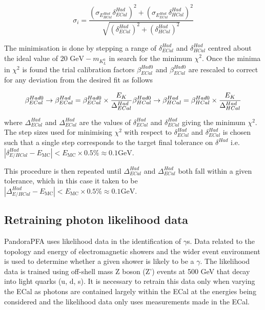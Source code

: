 \begin{equation}
\sigma_{i} = \frac{(\sigma_{E^{Had}_{HCal}}  \delta^{Had}_{ECal})^{2} + (\sigma_{E^{Had}_{ECal}} \delta^{Had}_{HCal})^{2}}{\sqrt{(\delta^{Had}_{ECal})^{2} + (\delta^{Had}_{HCal})^{2}}}
\label{equ:sigmaxicalc}
\end{equation}

The minimisation is done by stepping a range of $\delta^{Had}_{ECal}$ and $\delta^{Had}_{HCal}$ centred about the ideal value of $20 \text { GeV} - m_{K^{0}_{L}}$ in search for the minimum $\chi^{2}$.  Once the minima in $\chi^{2}$ is found the trial calibration factors $\beta^{Had0}_{ECal}$ and $\beta^{Had0}_{ECal}$ are rescaled to correct for any deviation from the desired fit as follows

\begin{equation}
\beta^{Had0}_{ECal} \rightarrow \beta^{Had}_{ECal} = \beta^{Had0}_{ECal} \times \frac{E_{K}}{\Delta^{Had}_{ECal}} \\
\beta^{Had0}_{HCal} \rightarrow \beta^{Had}_{HCal} = \beta^{Had0}_{HCal} \times \frac{E_{K}}{\Delta^{Had}_{HCal}}
\end{equation}

where $\Delta^{Had}_{ECal}$ and $\Delta^{Had}_{ECal}$ are the values of $\delta^{Had}_{ECal}$ and $\delta^{Had}_{ECal}$ giving the minimum $\chi^{2}$.  The step sizes used for minimising $\chi^{2}$ with respect to $\delta^{Had}_{ECal}$ and $\delta^{Had}_{ECal}$ is chosen such that a single step corresponds to the target final tolerance on $\delta^{Had}$ i.e. $|\delta^{Had}_{E/HCal} - E_{\text{MC}}| < E_{\text{MC}} \times 0.5 \% \approx 0.1 \text{GeV}$.  

This procedure is then repeated until $\Delta^{Had}_{ECal}$ and $\Delta^{Had}_{ECal}$ both fall within a given tolerance, which in this case it taken to be $|\Delta^{Had}_{E/HCal} - E_{\text{MC}}| < E_{\text{MC}} \times 0.5 \% \approx 0.1 \text{GeV}$.


\subsection{Retraining photon likelihood data}
PandoraPFA uses likelihood data in the identification of $\gamma$s.  Data related to the topology and energy of electromagnetic showers and the wider event environment is used to determine whether a given shower is likely to be a $\gamma$.  The likelihood data is trained using off-shell mass Z boson (Z') events at 500 GeV that decay into light quarks (u, d, s).  It is necessary to retrain this data only when varying the ECal as photons are contained largely within the ECal at the energies being considered and the likelihood data only uses measurements made in the ECal.

